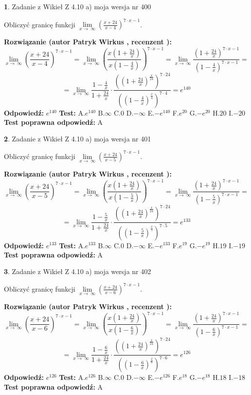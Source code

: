 \documentclass[12pt, a4paper]{article}
\theoremstyle{definition} %
\newtheorem{zad}{}
\newcommand{\zadStart}[1]{\begin{zad}#1\newline}
\newcommand{\zadStop}{\end{zad}}
\newcommand{\rozwStart}[2]{\noindent \textbf{Rozwiązanie (autor #1 , recenzent #2): }\newline}
\newcommand{\rozwStop}{\newline}
\newcommand{\odpStart}{\noindent \textbf{Odpowiedź:}\newline}
\newcommand{\odpStop}{\newline}
\newcommand{\testStart}{\noindent \textbf{Test:}\newline}
\newcommand{\testStop}{\newline}
\newcommand{\kluczStart}{\noindent \textbf{Test poprawna odpowiedź:}\newline}
\newcommand{\kluczStop}{\newline}
\begin{document}
\zadStart{Zadanie z Wikieł Z 4.10 a) moja wersja nr 400}

Obliczyć granicę funkcji  $\lim\limits_{x\to\ \infty}(\frac{x+24}{x-4})^{7\cdot x-1}$.
\zadStop
\rozwStart{Patryk Wirkus}{}
$$\lim\limits_{x\to\ \infty}(\frac{x+24}{x-4})^{7\cdot x-1} = \lim\limits_{x\to\ \infty}(\frac{x(1+\frac{24}{x})}{x(1-\frac{4}{x})})^{7\cdot x-1}=\lim\limits_{x\to\ \infty}\frac{(1+\frac{24}{x})^{7\cdot x-1}}{(1-\frac{4}{x})^{7\cdot x-1}}=$$
$$=\lim\limits_{x\to\ \infty}\frac{1-\frac{4}{x}}{1+\frac{24}{x}}\cdot\frac{((1+\frac{24}{x})^{\frac{x}{24}})^{7\cdot24}}{((1-\frac{4}{x})^{\frac{x}{4}})^{7\cdot4}}=e^{140}$$
\rozwStop
\odpStart
$e^{140}$
\odpStop
\testStart
A.$e^{140}$ B.$\infty$ C.$0$ D.$-\infty$ E.$-e^{140}$
F.$e^{20}$ G.$-e^{20}$
H.$20$
I.$-20$
\testStop
\kluczStart
A
\kluczStop



\zadStart{Zadanie z Wikieł Z 4.10 a) moja wersja nr 401}

Obliczyć granicę funkcji  $\lim\limits_{x\to\ \infty}(\frac{x+24}{x-5})^{7\cdot x-1}$.
\zadStop
\rozwStart{Patryk Wirkus}{}
$$\lim\limits_{x\to\ \infty}(\frac{x+24}{x-5})^{7\cdot x-1} = \lim\limits_{x\to\ \infty}(\frac{x(1+\frac{24}{x})}{x(1-\frac{5}{x})})^{7\cdot x-1}=\lim\limits_{x\to\ \infty}\frac{(1+\frac{24}{x})^{7\cdot x-1}}{(1-\frac{5}{x})^{7\cdot x-1}}=$$
$$=\lim\limits_{x\to\ \infty}\frac{1-\frac{5}{x}}{1+\frac{24}{x}}\cdot\frac{((1+\frac{24}{x})^{\frac{x}{24}})^{7\cdot24}}{((1-\frac{5}{x})^{\frac{x}{5}})^{7\cdot5}}=e^{133}$$
\rozwStop
\odpStart
$e^{133}$
\odpStop
\testStart
A.$e^{133}$ B.$\infty$ C.$0$ D.$-\infty$ E.$-e^{133}$
F.$e^{19}$ G.$-e^{19}$
H.$19$
I.$-19$
\testStop
\kluczStart
A
\kluczStop



\zadStart{Zadanie z Wikieł Z 4.10 a) moja wersja nr 402}

Obliczyć granicę funkcji  $\lim\limits_{x\to\ \infty}(\frac{x+24}{x-6})^{7\cdot x-1}$.
\zadStop
\rozwStart{Patryk Wirkus}{}
$$\lim\limits_{x\to\ \infty}(\frac{x+24}{x-6})^{7\cdot x-1} = \lim\limits_{x\to\ \infty}(\frac{x(1+\frac{24}{x})}{x(1-\frac{6}{x})})^{7\cdot x-1}=\lim\limits_{x\to\ \infty}\frac{(1+\frac{24}{x})^{7\cdot x-1}}{(1-\frac{6}{x})^{7\cdot x-1}}=$$
$$=\lim\limits_{x\to\ \infty}\frac{1-\frac{6}{x}}{1+\frac{24}{x}}\cdot\frac{((1+\frac{24}{x})^{\frac{x}{24}})^{7\cdot24}}{((1-\frac{6}{x})^{\frac{x}{6}})^{7\cdot6}}=e^{126}$$
\rozwStop
\odpStart
$e^{126}$
\odpStop
\testStart
A.$e^{126}$ B.$\infty$ C.$0$ D.$-\infty$ E.$-e^{126}$
F.$e^{18}$ G.$-e^{18}$
H.$18$
I.$-18$
\testStop
\kluczStart
A
\kluczStop
\end{document}
